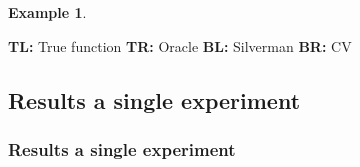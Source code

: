 \documentclass[notheorems]{beamer}
\theoremstyle{definition}
\theoremstyle{example}
\newtheorem{example}{Example}
\begin{document}
\begin{frame}
\begin{example}
{        }
        \centerline{
            \tiny
            \textbf{TL:} True function \textbf{TR:} Oracle \textbf{BL:} Silverman \textbf{BR:} CV
        }
    \end{example}
\end{frame}

\subsection{Results a single experiment}
\begin{frame}\frametitle{Results a single experiment}
    \begin{table}
        \centering
        \footnotesize
        
        \caption
            {Mean error rates for uniform population, single-peak risk with spread 1.0 with expected number of incidents 100}
    \end{table}
\end{frame}


\end{document}
